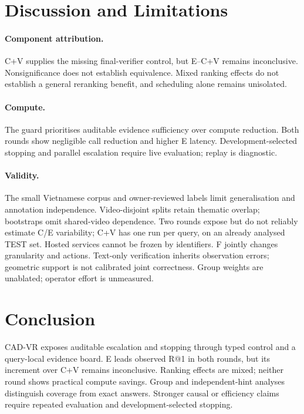 \documentclass[runningheads]{llncs}
\begin{document}
\FloatBarrier

\section{Discussion and Limitations}
\label{sec:discussion}
\paragraph{Component attribution.} C+V supplies the missing final-verifier control, but E--C+V remains inconclusive. Nonsignificance does not establish equivalence. Mixed ranking effects do not establish a general reranking benefit, and scheduling alone remains unisolated.

\paragraph{Compute.} The guard prioritises auditable evidence sufficiency over compute reduction. Both rounds show negligible call reduction and higher E latency. Development-selected stopping and parallel escalation require live evaluation; replay is diagnostic.

\paragraph{Validity.} The small Vietnamese corpus and owner-reviewed labels limit generalisation and annotation independence. Video-disjoint splits retain thematic overlap; bootstraps omit shared-video dependence. Two rounds expose but do not reliably estimate C/E variability; C+V has one run per query, on an already analysed TEST set. Hosted services cannot be frozen by identifiers. F jointly changes granularity and actions. Text-only verification inherits observation errors; geometric support is not calibrated joint correctness. Group weights are unablated; operator effort is unmeasured.

\section{Conclusion}
\label{sec:conclusion}
CAD-VR exposes auditable escalation and stopping through typed control and a query-local evidence board. E leads observed R@1 in both rounds, but its increment over C+V remains inconclusive. Ranking effects are mixed; neither round shows practical compute savings. Group and independent-hint analyses distinguish coverage from exact answers. Stronger causal or efficiency claims require repeated evaluation and development-selected stopping.



\end{document}
